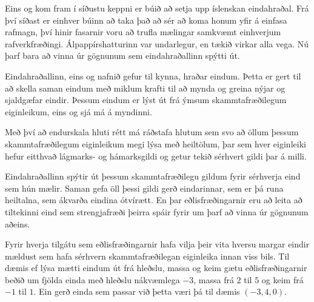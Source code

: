 
Eins og kom fram í síðustu keppni er búið að setja upp
íslenskan eindahraðal. Frá því síðast er einhver búinn að
taka það að sér að koma honum yfir á einfasa rafmagn, því
hinir fasarnir voru að trufla mælingar samkvæmt einhverjum
rafverkfræðingi. Álpappírshatturinn var undarlegur, en tækið
virkar alla vega. Nú þarf bara að vinna úr gögnunum sem
eindahraðallinn spýtti út.

Eindahraðallinn, eins og nafnið gefur til kynna, hraðar
eindum. Þetta er gert til að skella saman eindum með miklum
krafti til að mynda og greina nýjar og sjaldgæfar eindir.
Þessum eindum er lýst út frá ýmsum skammtafræðilegum
eiginleikum, eins og sjá má á myndinni. 

Með því að endurskala hluti rétt má ráðstafa hlutum sem svo
að öllum þessum skammtafræðilegum eiginleikum megi lýsa með
heiltölum, þar sem hver eiginleiki hefur eitthvað
lágmarks- og hámarksgildi og getur tekið sérhvert gildi
þar á milli.

Eindahraðallinn spýtir út þessum skammtafræðilegu gildum
fyrir sérhverja eind sem hún mælir. Saman gefa öll þessi
gildi gerð eindarinnar, sem er þá runa heiltalna, sem 
ákvarða eindina ótvírætt. En þar eðlisfræðingarnir
eru að leita að tiltekinni eind sem strengjafræði þeirra
spáir fyrir um þarf að vinna úr gögnunum aðeins.

Fyrir hverja tilgátu sem eðlisfræðingarnir hafa vilja þeir
vita hversu margar eindir mældust sem hafa sérhvern
skammtafræðilegan eiginleika innan viss bils. Til dæmis
ef lýsa mætti eindum út frá hleðslu, massa og keim gætu
eðlisfræðingarnir beðið um fjölda einda með hleðslu
nákvæmlega $-3$, massa frá $2$ til $5$ og keim frá $-1$
til $1$. Ein gerð einda sem passar við þetta væri þá
til dæmis $(-3, 4, 0)$.

